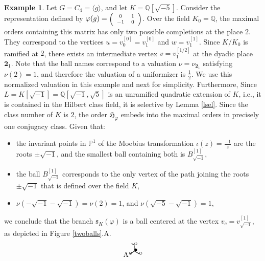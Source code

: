 \documentclass{article}
\theoremstyle{definition}
\newtheorem{ex}[Prop]{Example}
\theoremstyle{remark}
\newcommand\sbmattrix[4]{\textnormal{\scriptsize$\left(\begin{array}{cc}#1&#2\\#3&#4\end{array}\right)$\normalsize}}
\begin{document}
\begin{ex}\label{e89}
    Let $G=C_4=\langle g\rangle$, and let $
    K=\mathbb{Q}[\sqrt{-5}]$. Consider
    the representation defined by 
    $\varphi(g)=\sbmattrix 01{-1}0$. Over the field 
    $K_0=\mathbb{Q}$, the maximal orders containing this
    matrix has only two possible completions at the place $2$.
    They correspond to the vertices $u=v_0^{[0]}=v_1^{[0]}$ 
    and $w=v_1^{[1]}$.
    Since $K/K_0$ is ramified at $2$, there exists an intermediate
    vertex $v=v_1^{[1/2]}$ at the dyadic place $\mathbf{2}_1$.
    Note that the ball names correspond to a valuation
    $\nu=\nu_{\mathbf{2}_1}$ satisfying $\nu(2)=1$,
    and therefore the valuation of a uniformizer is $\frac12$.
    We use this normalized valuation in this example
    and next for simplicity.
    Furthermore, Since $L=K[\sqrt{-1}]=
    \mathbb{Q}[\sqrt{-1},\sqrt5]$ is an unramified quadratic
    extension of $K$, i.e., it is contained in the Hilbert class
    field, it is selective by Lemma \ref{lsel}. 
    Since the class number
    of $K$ is $2$, the order $\mathfrak{H}_\varphi$ embeds into
    the maximal orders in precisely one conjugacy class.
    Given that:
    \begin{itemize}
        \item the invariant points in $\mathbb{P}^1$ of
    the Moebius transformation $\iota(z)=\frac{-1}z$ are
    the roots $\pm\sqrt{-1}$, and the smallest ball containing
    both is $B_{\sqrt{-1}}^{[1]}$,
        \item the ball $B_{\sqrt{-1}}^{[1]}$ corresponds to
    the only vertex of the path joining the roots $\pm\sqrt{-1}$
    that is defined over the field $K$,
        \item $\nu(-\sqrt{-1}-\sqrt{-1})=\nu(2)=1$, and 
    $\nu(\sqrt{-5}-\sqrt{-1})=1$,
    \end{itemize}
    we conclude that the 
    branch $\mathfrak{s}_K(\varphi)$ is a ball centered at
    the vertex $v_c=v_{\sqrt{-1}}^{[1]}$, as depicted in Figure \ref{twoballs}.A.
\begin{figure}
\unitlength 1mm %
\linethickness{0.4pt}
\ifx\plotpoint\undefined\newsavebox{\plotpoint}\fi %
\[
\begin{picture}(38,20)(-6,32)
\put(0,36){A}
\put(15.2,43.2){$\bullet$}\put(15.2,51.8){$\circ$}
\put(16,44){\line(0,1){8}}
\multiput(16,44)(0.086,-.05){80}{\line(1,0){.3}}
\multiput(16,44)(-0.086,-.05){80}{\line(-1,0){.3}}
\put(7.7,38.7){$\circ$}\put(22.3,38.7){$\circ$}
\multiput(15.4,52.6)(-0.086,.05){40}{\line(-1,0){.3}}

\end{picture}\]
\end{figure}
\end{ex}
\end{document}

